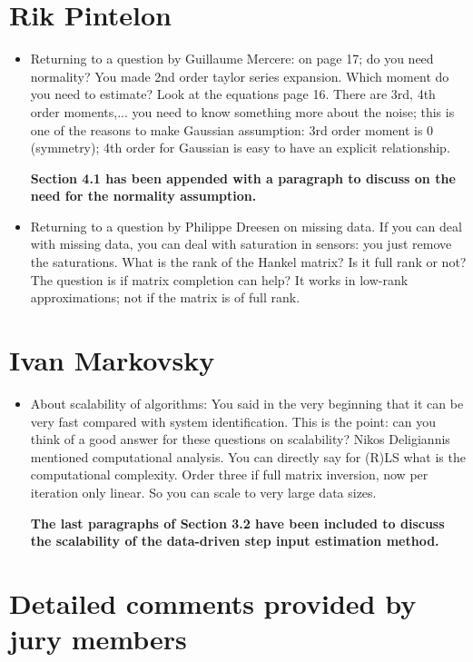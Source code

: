 \documentclass[11pt]{article}
\begin{document}
\section*{Rik Pintelon}

\begin{itemize}
	\item Returning to a question by Guillaume Mercere: on page 17; do you need normality? You made 2nd order taylor series expansion. Which moment do you need to estimate? Look at the equations page 16. There are 3rd, 4th order moments,... you need to know something more about the noise; this is one of the reasons to make Gaussian assumption: 3rd order moment is 0 (symmetry); 4th order for Gaussian is easy to have an explicit relationship.
	
    {\bfseries Section 4.1 has been appended with a paragraph to discuss on the need for the normality assumption.  }

	\item  Returning to a question by Philippe Dreesen on missing data. If you can deal with missing data, you can deal with saturation in sensors: you just remove the saturations. What is the rank of the Hankel matrix? Is it full rank or not? The question is if matrix completion can help? It works in low-rank approximations; not if the matrix is of full rank.
\end{itemize}

\section*{Ivan Markovsky}

\begin{itemize}
	\item About scalability of algorithms: You said in the very beginning that it can be very fast compared with system identification. This is the point: can you think of a good answer for these questions on scalability? Nikos Deligiannis mentioned computational analysis. You can directly say for (R)LS what is the computational complexity. Order three if full matrix inversion, now per iteration only linear. So you can scale to very large data sizes.
	
	{\bfseries The last paragraphs of Section 3.2 have been included to discuss the scalability of the data-driven step input estimation method.  }

\end{itemize}

\section*{Detailed comments provided by jury members}
\end{document}
